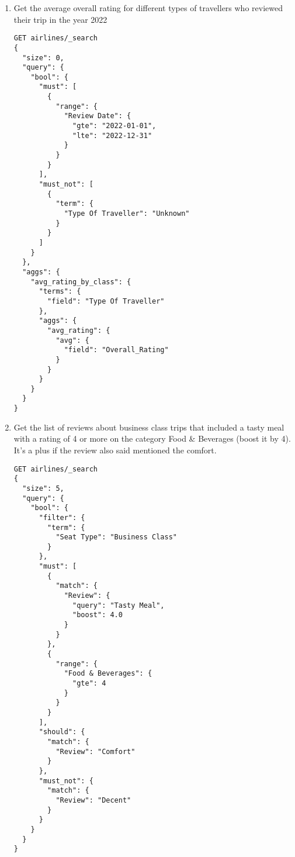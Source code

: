 \documentclass{Configuration_Files/PoliMi3i_thesis}
\begin{document}
\begin{enumerate}

    \item Get the average overall rating for different types of travellers who reviewed their trip in the year 2022

\begin{verbatim}
GET airlines/_search
{
  "size": 0,
  "query": {
    "bool": {
      "must": [
        {
          "range": {
            "Review Date": {
              "gte": "2022-01-01",
              "lte": "2022-12-31"
            }
          }
        }
      ],
      "must_not": [
        {
          "term": {
            "Type Of Traveller": "Unknown"
          }
        }
      ]
    }
  },
  "aggs": {
    "avg_rating_by_class": {
      "terms": {
        "field": "Type Of Traveller"
      },
      "aggs": {
        "avg_rating": {
          "avg": {
            "field": "Overall_Rating"
          }
        }
      }
    }
  }
}

\end{verbatim}

    \item Get the list of reviews about business class trips that included a tasty meal with a rating of 4 or more on the category Food \& Beverages (boost it by 4). It's a plus if the review also said mentioned the comfort.

\begin{verbatim}
GET airlines/_search
{
  "size": 5, 
  "query": {
    "bool": {
      "filter": {
        "term": {
          "Seat Type": "Business Class"
        }
      },
      "must": [
        {
          "match": {
            "Review": {
              "query": "Tasty Meal",
              "boost": 4.0
            }
          }
        },
        {
          "range": {
            "Food & Beverages": {
              "gte": 4
            }
          }
        }
      ],
      "should": {
        "match": {
          "Review": "Comfort"
        }
      }, 
      "must_not": {
        "match": {
          "Review": "Decent"
        }
      }
    }
  }
}


\end{verbatim}
\end{enumerate}
\end{document}
